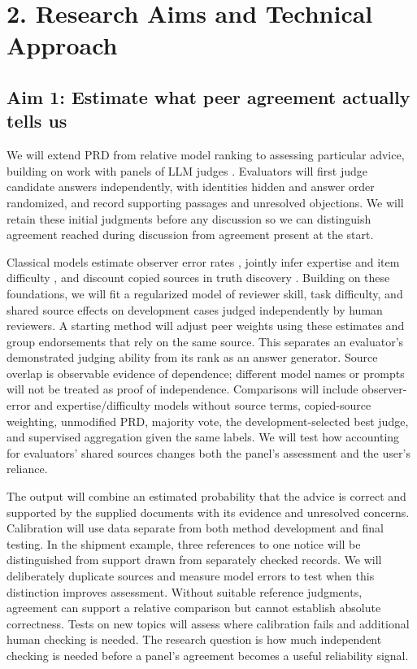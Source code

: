 \documentclass[12pt]{article}
\begin{document}
\section*{2. Research Aims and Technical Approach}

\subsection*{Aim 1: Estimate what peer agreement actually tells us}

We will extend PRD from relative model ranking to assessing particular advice, building on work with panels of LLM judges \citep{verga2024juries}. Evaluators will first judge candidate answers independently, with identities hidden and answer order randomized, and record supporting passages and unresolved objections. We will retain these initial judgments before any discussion so we can distinguish agreement reached during discussion from agreement present at the start.

Classical models estimate observer error rates \citep{dawid1979maximum}, jointly infer expertise and item difficulty \citep{whitehill2009whose}, and discount copied sources in truth discovery \citep{dong2009dependence}. Building on these foundations, we will fit a regularized model of reviewer skill, task difficulty, and shared source effects on development cases judged independently by human reviewers. A starting method will adjust peer weights using these estimates and group endorsements that rely on the same source. This separates an evaluator's demonstrated judging ability from its rank as an answer generator. Source overlap is observable evidence of dependence; different model names or prompts will not be treated as proof of independence. Comparisons will include observer-error and expertise/difficulty models without source terms, copied-source weighting, unmodified PRD, majority vote, the development-selected best judge, and supervised aggregation given the same labels. We will test how accounting for evaluators' shared sources changes both the panel's assessment and the user's reliance.

The output will combine an estimated probability that the advice is correct and supported by the supplied documents with its evidence and unresolved concerns. Calibration will use data separate from both method development and final testing. In the shipment example, three references to one notice will be distinguished from support drawn from separately checked records. We will deliberately duplicate sources and measure model errors to test when this distinction improves assessment. Without suitable reference judgments, agreement can support a relative comparison but cannot establish absolute correctness. Tests on new topics will assess where calibration fails and additional human checking is needed. The research question is how much independent checking is needed before a panel's agreement becomes a useful reliability signal.
\end{document}
